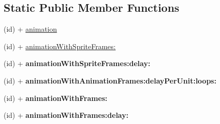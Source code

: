 \subsection*{Static Public Member Functions}
\begin{DoxyCompactItemize}
\item 
(id) + \hyperlink{interface_c_c_animation_a893326d26e30f5dc3880ec18c9a1b864}{animation}
\item 
(id) + \hyperlink{interface_c_c_animation_ad0efc734ec43d2906723f04398007701}{animation\-With\-Sprite\-Frames\-:}
\item 
\hypertarget{interface_c_c_animation_af7091ace01c4e5f9d66064f7a9c81c98}{(id) + {\bfseries animation\-With\-Sprite\-Frames\-:delay\-:}}\label{interface_c_c_animation_af7091ace01c4e5f9d66064f7a9c81c98}

\item 
\hypertarget{interface_c_c_animation_adb65c4134079376e72cf4e7daf54e2b1}{(id) + {\bfseries animation\-With\-Animation\-Frames\-:delay\-Per\-Unit\-:loops\-:}}\label{interface_c_c_animation_adb65c4134079376e72cf4e7daf54e2b1}

\item 
\hypertarget{interface_c_c_animation_afb6aa2980f1d08a93b98f57164871ca6}{(id) + {\bfseries animation\-With\-Frames\-:}}\label{interface_c_c_animation_afb6aa2980f1d08a93b98f57164871ca6}

\item 
\hypertarget{interface_c_c_animation_a93907953d398d6193232bb4e9360e937}{(id) + {\bfseries animation\-With\-Frames\-:delay\-:}}\label{interface_c_c_animation_a93907953d398d6193232bb4e9360e937}

\end{DoxyCompactItemize}

